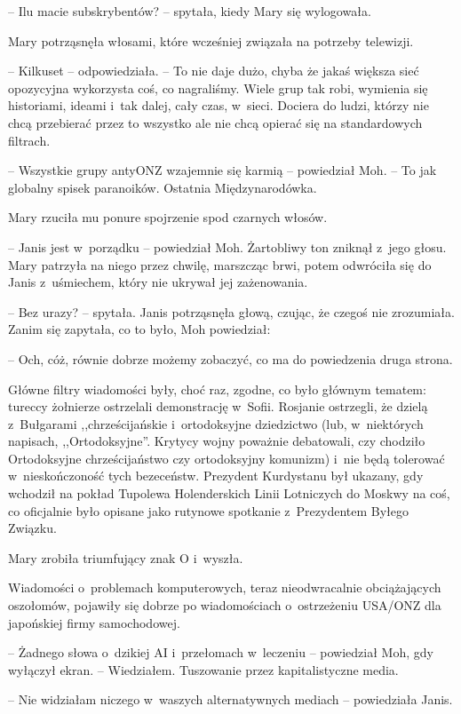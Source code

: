 \documentclass[oneside,polish,11pt,sfheadings]{mwbk}
\begin{document}
-- Ilu macie subskrybentów? -- spytała, kiedy Mary się wylogowała.

Mary potrząsnęła włosami, które wcześniej związała na potrzeby
telewizji. 

-- Kilkuset -- odpowiedziała. -- To nie daje dużo, chyba że
jakaś większa sieć opozycyjna wykorzysta coś, co nagraliśmy. Wiele grup
tak robi, wymienia się historiami, ideami i~tak dalej, cały czas, w~sieci. Dociera do ludzi, którzy nie chcą przebierać przez to wszyst\-ko
ale nie chcą opierać się na standardowych filtrach.

-- Wszystkie grupy antyONZ wzajemnie się karmią -- powiedział Moh. -- To
jak globalny spisek paranoików. Ostatnia Międzynarodówka.

Mary rzuciła mu ponure spojrzenie spod czarnych włosów.

-- Janis jest w~porządku -- powiedział Moh. Żartobliwy ton zniknął z~jego
głosu. Mary patrzyła na niego przez chwilę, marszcząc brwi, potem
odwróciła się do Janis z~uśmiechem, który nie ukrywał jej zażenowania.

-- Bez urazy? -- spytała. Janis potrząsnęła głową, czując, że czegoś nie
zrozumiała. Zanim się zapytała, co to było, Moh powiedział: 

-- Och, cóż,
równie dobrze możemy zobaczyć, co ma do powiedzenia druga strona.

Główne filtry wiadomości były, choć raz, zgodne, co było głównym
tematem: tureccy żołnierze ostrzelali demonstrację w~Sofii. Rosjanie
ostrzegli, że dzielą z~Bułgarami ,,chrześcijańskie i~ortodoksyjne
dziedzictwo (lub, w~niektórych napisach, ,,Ortodoksyjne''. Krytycy wojny
poważnie debatowali, czy chodziło Ortodoksyjne chrześcijaństwo czy
ortodoksyjny komunizm) i~nie będą tolerować w~nieskończoność tych
bezeceństw. Prezydent Kurdystanu był ukazany, gdy wchodził na pokład
Tupolewa Holenderskich Linii Lotniczych do Moskwy na coś, co oficjalnie
było opisane jako rutynowe spotkanie z~Prezydentem Byłego Związku.

Mary zrobiła triumfujący znak O i~wyszła.

Wiadomości o~problemach komputerowych, teraz nieodwracalnie
obciążających oszołomów, pojawiły się dobrze po wiadomościach o~ostrzeżeniu USA/ONZ dla japońskiej firmy samochodowej.

-- Żadnego słowa o~dzikiej AI i~przełomach w~leczeniu -- powiedział Moh,
gdy wyłączył ekran. -- Wiedziałem. Tuszowanie przez kapitalistyczne
media.

-- Nie widziałam niczego w~waszych alternatywnych mediach -- powiedziała
Janis.
\end{document}
